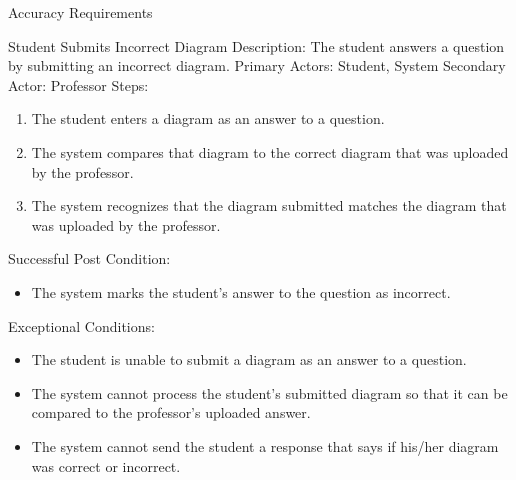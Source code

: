 \documentclass{article}
\begin{document}
\begin{section}{Accuracy Requirements}
\begin{subsection}{Student Submits Incorrect Diagram}
Description: The student answers a question by submitting an incorrect diagram. \newline
Primary Actors: Student, System \newline
Secondary Actor: Professor \newline
Steps:
\begin{enumerate}
\item{The student enters a diagram as an answer to a question.}
\item{The system compares that diagram to the correct diagram that was uploaded by the professor.}
\item{The system recognizes that the diagram submitted matches the diagram that was uploaded by the professor.}
\end{enumerate}
Successful Post Condition:
\begin{itemize}
\item{The system marks the student’s answer to the question as incorrect.}
\end{itemize}
Exceptional Conditions:
\begin{itemize}
\item{The student is unable to submit a diagram as an answer to a question.}
\item{The system cannot process the student’s submitted diagram so that it can be compared to the professor’s uploaded answer.}
\item{The system cannot send the student a response that says if his/her diagram was correct or incorrect.}
\end{itemize}
\end{subsection}

\end{section}
\end{document}
